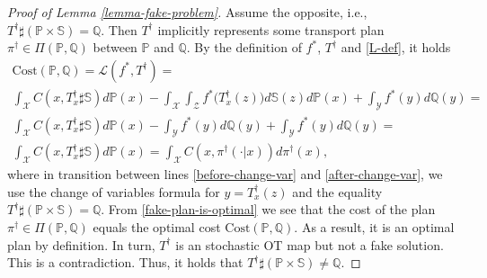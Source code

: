 \documentclass{article} %
\begin{document}
\begin{proof}[Proof of Lemma \ref{lemma-fake-problem}] Assume the opposite, i.e., $T^{\dagger}\sharp(\mathbb{P}\times\mathbb{S})=\mathbb{Q}$. Then $T^{\dagger}$ implicitly represents some transport plan $\pi^{\dagger}\in\Pi(\mathbb{P},\mathbb{Q})$ between $\mathbb{P}$ and $\mathbb{Q}$. By the definition of $f^{*}$, $T^{\dagger}$ and \eqref{L-def}, it holds
\begin{eqnarray}
\text{Cost}(\mathbb{P},\mathbb{Q})=\mathcal{L}(f^{*},T^{\dagger})=
\nonumber
\\
\int_{\mathcal{X}}C(x,T^{\dagger}_{x}\sharp\mathbb{S})d\mathbb{P}(x)-\int_{\mathcal{X}}\int_{\mathcal{Z}}f^{*}\big(T^{\dagger}_{x}(z)\big)d\mathbb{S}(z)d\mathbb{P}(x)+\int_{\mathcal{Y}}f^{*}(y)d\mathbb{Q}(y)=
\label{before-change-var}
\\
\int_{\mathcal{X}}C(x,T^{\dagger}_{x}\sharp\mathbb{S})d\mathbb{P}(x)-\int_{\mathcal{Y}}f^{*}(y)d\mathbb{Q}(y)+\int_{\mathcal{Y}}f^{*}(y)d\mathbb{Q}(y)=
\label{after-change-var}
\\
\int_{\mathcal{X}}C(x,T^{\dagger}_{x}\sharp\mathbb{S})d\mathbb{P}(x)=\int_{\mathcal{X}}C(x,\pi^{\dagger}(\cdot|x))d\pi^{\dagger}(x),
\label{fake-plan-is-optimal}
\end{eqnarray}
where in transition between lines \eqref{before-change-var} and \eqref{after-change-var}, we use the change of variables formula for $y=T_{x}^{\dagger}(z)$ and the equality $T^{\dagger}\sharp(\mathbb{P}\times\mathbb{S})=\mathbb{Q}$. From \eqref{fake-plan-is-optimal} we see that the cost of the plan $\pi^{\dagger}\in\Pi(\mathbb{P},\mathbb{Q})$ equals the optimal cost $\text{Cost}(\mathbb{P},\mathbb{Q})$. As a result, it is an optimal plan by definition. In turn, $T^{\dagger}$ is an stochastic OT map but not a fake solution. This is a contradiction. Thus, it holds that $T^{\dagger}\sharp(\mathbb{P}\times\mathbb{S})\neq\mathbb{Q}$.
\end{proof}
\end{document}
